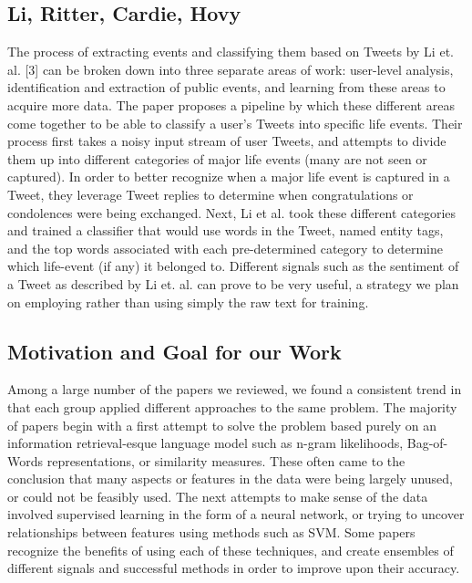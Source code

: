 \documentclass[11pt]{article}
\begin{document}
\subsection{Li, Ritter, Cardie, Hovy}

The process of extracting events and classifying them based on Tweets by Li et. al. [3] can be broken down into three separate areas of work: user-level analysis, identification and extraction of public events, and learning from these areas to acquire more data. The paper proposes a pipeline by which these different areas come together to be able to classify a user’s Tweets into specific life events. Their process first takes a noisy input stream of user Tweets, and attempts to divide them up into different categories of major life events (many are not seen or captured). In order to better recognize when a major life event is captured in a Tweet, they leverage Tweet replies to determine when congratulations or condolences were being exchanged. Next, Li et al. took these different categories and trained a classifier that would use words in the Tweet, named entity tags, and the top words associated with each pre-determined category to determine which life-event (if any) it belonged to. Different signals such as the sentiment of a Tweet as described by Li et. al. can prove to be very useful, a strategy we plan on employing rather than using simply the raw text for training.

\subsection{Motivation and Goal for our Work}

Among a large number of the papers we reviewed, we found a consistent trend in that each group applied different approaches to the same problem. The majority of papers begin with a first attempt to solve the problem based purely on an information retrieval-esque language model such as n-gram likelihoods, Bag-of-Words representations, or similarity measures. These often came to the conclusion that many aspects or features in the data were being largely unused, or could not be feasibly used. The next attempts to make sense of the data involved supervised learning in the form of a neural network, or trying to uncover relationships between features using methods such as SVM. Some papers recognize the benefits of using each of these techniques, and create ensembles of different signals and successful methods in order to improve upon their accuracy.
\end{document}
